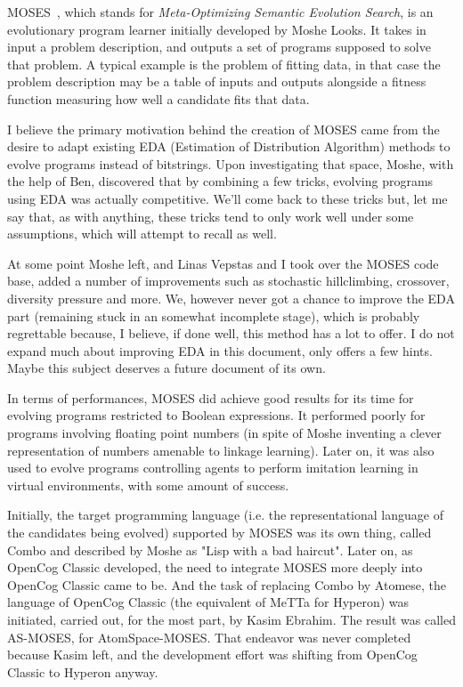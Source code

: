 \documentclass[]{report}
\begin{document}
MOSES~\cite{Looks06abstractcompetent}, which stands
for \emph{Meta-Optimizing Semantic Evolution Search}, is an
evolutionary program learner initially developed by Moshe Looks.  It
takes in input a problem description, and outputs a set of programs
supposed to solve that problem.  A typical example is the problem of
fitting data, in that case the problem description may be a table of
inputs and outputs alongside a fitness function measuring how well a
candidate fits that data.

I believe the primary motivation behind the creation of MOSES came
from the desire to adapt existing EDA (Estimation of Distribution
Algorithm) methods to evolve programs instead of bitstrings.  Upon
investigating that space, Moshe, with the help of Ben, discovered that
by combining a few tricks, evolving programs using EDA was actually
competitive.  We'll come back to these tricks but, let me say that, as
with anything, these tricks tend to only work well under some
assumptions, which will attempt to recall as well.

At some point Moshe left, and Linas Vepstas and I took over the MOSES
code base, added a number of improvements such as stochastic
hillclimbing, crossover, diversity pressure and more.  We, however
never got a chance to improve the EDA part (remaining stuck in an
somewhat incomplete stage), which is probably regrettable because, I
believe, if done well, this method has a lot to offer.  I do not
expand much about improving EDA in this document, only offers a few
hints.  Maybe this subject deserves a future document of its own.

In terms of performances, MOSES did achieve good results for its time
for evolving programs restricted to Boolean expressions.  It performed
poorly for programs involving floating point numbers (in spite of
Moshe inventing a clever representation of numbers amenable to linkage
learning).  Later on, it was also used to evolve programs controlling
agents to perform imitation learning in virtual environments, with
some amount of success.

Initially, the target programming language (i.e. the representational
language of the candidates being evolved) supported by MOSES was its
own thing, called Combo and described by Moshe as "Lisp with a bad
haircut".  Later on, as OpenCog Classic developed, the need to
integrate MOSES more deeply into OpenCog Classic came to be.  And the
task of replacing Combo by Atomese, the language of OpenCog Classic
(the equivalent of MeTTa for Hyperon) was initiated, carried out, for
the most part, by Kasim Ebrahim.  The result was called AS-MOSES, for
AtomSpace-MOSES.  That endeavor was never completed because Kasim
left, and the development effort was shifting from OpenCog Classic to
Hyperon anyway.
\end{document}
